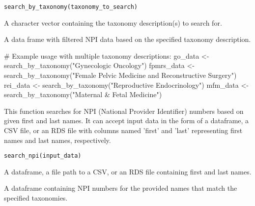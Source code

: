 \documentclass[a4paper]{book}
\begin{document}
%
\begin{Usage}
\begin{verbatim}
search_by_taxonomy(taxonomy_to_search)
\end{verbatim}
\end{Usage}
%
\begin{Arguments}
\begin{ldescription}
\item[\code{taxonomy\_to\_search}] A character vector containing the taxonomy description(s) to search for.
\end{ldescription}
\end{Arguments}
%
\begin{Value}
A data frame with filtered NPI data based on the specified taxonomy description.
\end{Value}
%
\begin{Examples}
\begin{ExampleCode}
# Example usage with multiple taxonomy descriptions:
go_data <- search_by_taxonomy("Gynecologic Oncology")
fpmrs_data <- search_by_taxonomy("Female Pelvic Medicine and Reconstructive Surgery")
rei_data <- search_by_taxonomy("Reproductive Endocrinology")
mfm_data <- search_by_taxonomy("Maternal & Fetal Medicine")

\end{ExampleCode}
\end{Examples}
%
\begin{Description}
This function searches for NPI (National Provider Identifier) numbers based on
given first and last names. It can accept input data in the form of a dataframe,
a CSV file, or an RDS file with columns named 'first' and 'last' representing
first names and last names, respectively.
\end{Description}
%
\begin{Usage}
\begin{verbatim}
search_npi(input_data)
\end{verbatim}
\end{Usage}
%
\begin{Arguments}
\begin{ldescription}
\item[\code{input\_data}] A dataframe, a file path to a CSV, or an RDS file containing
first and last names.
\end{ldescription}
\end{Arguments}
%
\begin{Value}
A dataframe containing NPI numbers for the provided names that match
the specified taxonomies.
\end{Value}
\end{document}
